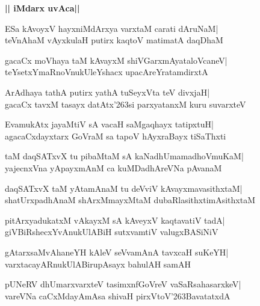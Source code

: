 \documentclass[twoside,12pt,openright]{book}
\def\S{\char'263}
\newcounter{shloka}[chapter]
\def\uvaca#1{\centerline{{\large\textbf{#1}}}}
\begin{document}
\uvaca{|| iMdarx uvAca||}
\begin{shloka}%
ESa kAvoyxV hayxniMdArxya varxtaM carati dAruNaM|\\
teVnAhaM vAyxkulaH putirx kaqtoV matimatA daqDhaM
\end{shloka}

\begin{shloka}%
gacaCx moVhaya taM kAvayxM shiVGarxmAyataloVcaneV|\\
teYsetxYmaRnoVnukUleYshacx upacAreYratamdirxtA
\end{shloka}

\begin{shloka}%
ArAdhaya tathA putirx yathA tuSeyxVta teV divxjaH|\\
gacaCx tavxM tasayx datAtx\S si parxyatanxM kuru suvarxteV
\end{shloka}

\begin{shloka}%
EvamukAtx jayaMtiV sA vacaH saMgaqhayx tatipxtuH|\\
agacaCxdayxtarx GoVraM sa tapoV hAyxraBayx tiSaThxti
\end{shloka}

\begin{shloka}%
taM daqSATxvX tu pibaMtaM sA kaNadhUmamadhoVmuKaM|\\
yajecnxVna yApayxmAnM ca kuMDadhAreVNa pAvanaM 
\end{shloka}

\begin{shloka}%
daqSATxvX taM yAtamAnaM tu deVviV kAvayxmavasithxtaM|\\
shatUrxpadhAnaM shArxMmayxMtaM dubaRlasithxtimAsithxtaM
\end{shloka}

\begin{shloka}%
pitArxyadukatxM vAkayxM sA kAveyxV kaqtavatiV tadA|\\
giVBiRshecxYvAnukUlABiH sutxvamtiV valugxBASiNiV
\end{shloka}

\begin{shloka}%
gAtarxsaMvAhaneYH kAleV seVvamAnA tavxcaH suKeYH|\\
varxtacayARnukUlABirupAsayx bahulAH samAH
\end{shloka}

\begin{shloka}%
pUNeRV dhUmarxvarxteV tasimxnfGoVreV vaSaRsahasarxkeV|\\
vareVNa caCxMdayAmAsa shivaH pirxVtoV\S BavatatxdA
\end{shloka}
\end{document}
